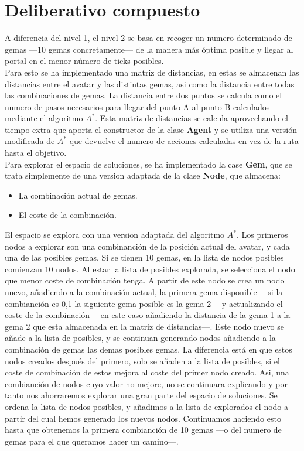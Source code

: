 \section{Deliberativo compuesto}
A diferencia del nivel 1, el nivel 2 se basa en recoger un numero determinado de gemas ---10 gemas concretamente--- de la manera más óptima posible y llegar al portal en el menor número de ticks posibles.
\\
Para esto se ha implementado una matriz de distancias, en estas se almacenan las distancias entre el avatar y las distintas gemas, asi como la distancia entre todas las combinaciones de gemas. La distancia entre dos puntos se calcula como el numero de pasos necesarios para llegar del punto A al punto B calculados mediante el algoritmo $ A^{*} $. Esta matriz de distancias se calcula aprovechando el tiempo extra que aporta el constructor de la clase \textbf{Agent} y se utiliza una versión modificada de $ A^{*} $ que devuelve el numero de acciones calculadas en vez de la ruta hasta el objetivo.\\
Para explorar el espacio de soluciones, se ha implementado la case \textbf{Gem}, que se trata simplemente de una version adaptada de la clase \textbf{Node}, que almacena:
\begin{itemize}
   \item La combinación actual de gemas.
   \item El coste de la combinación.
\end{itemize}
El espacio se explora con una version adaptada del algoritmo $ A^{*} $. Los primeros nodos a explorar son una combinanción de la posición actual del avatar, y cada una de las posibles gemas. Si se tienen 10 gemas, en la lista de nodos posibles comienzan 10 nodos. Al estar la lista de posibles explorada, se selecciona el nodo que menor coste de combinación tenga. A partir de este nodo se crea un nodo nuevo, añadiendo a la combinación actual, la primera gema disponible ---si la combianción es 0,1 la siguiente gema posible es la gema 2--- y actualizando el coste de la combinación ---en este caso añadiendo la distancia de la gema 1 a la gema 2 que esta almacenada en la matriz de distancias---. Este nodo nuevo se añade a la lista de posibles, y se continuan generando nodos añadiendo a la combinación de gemas las demas posibles gemas. La diferencia está en que estos nodos creados después del primero, solo se añaden a la lista de posibles, si el coste de combinación de estos mejora al coste del primer nodo creado. Asi, una combianción de nodos cuyo valor no mejore, no se continuara explicando y por tanto nos ahorraremos explorar una gran parte del espacio de soluciones. Se ordena la lista de nodos posibles, y añadimos a la lista de explorados el nodo a partir del cual hemos generado los nuevos nodos. Continuamos haciendo esto hasta que obtenemos la primera combianción de 10 gemas ---o del numero de gemas para el que queramos hacer un camino---.\\

